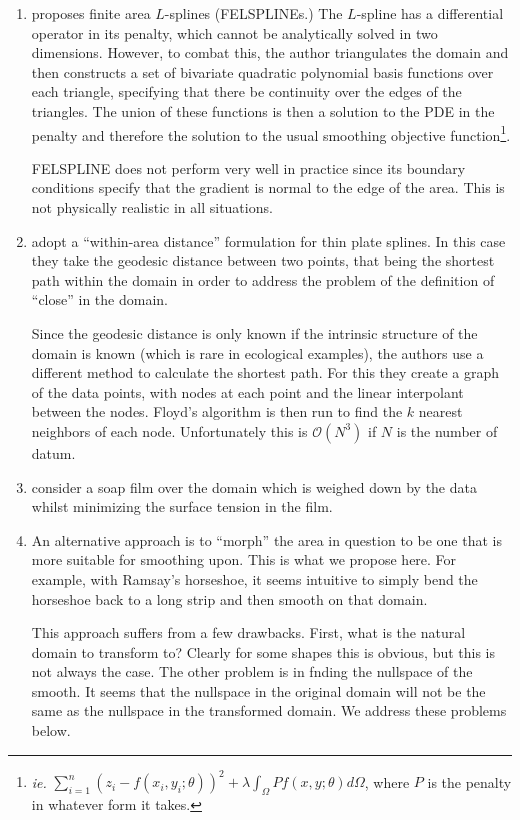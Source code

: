 \documentclass[a4paper,10pt]{amsart}
\begin{document}
\begin{enumerate}
\item \cite{ramsay} proposes finite area $L$-splines (FELSPLINEs.) The $L$-spline has a differential operator in its penalty, which cannot be analytically solved in two dimensions. However, to combat this, the author triangulates the domain and then constructs a set of bivariate quadratic polynomial basis functions over each triangle, specifying that there be continuity over the edges of the triangles. The union of these functions is then a solution to the PDE in the penalty and therefore the solution to the usual smoothing objective function\footnote{\emph{ie.} $\sum_{i=1}^n (z_i-f(x_i,y_i;\theta))^2 + \lambda \int_\Omega Pf(x,y;\theta)d\Omega$, where $P$  is the penalty in whatever form it takes.}.

FELSPLINE does not perform very well in practice since its boundary conditions specify that the gradient is normal to the edge of the area. This is not physically realistic in all situations.

\item \cite{wangranalli} adopt a ``within-area distance'' formulation for thin plate splines. In this case they take the geodesic distance between two points, that being the shortest path within the domain in order to address the problem of the definition of ``close'' in the domain. 

Since the geodesic distance is only known if the intrinsic structure of the domain is known (which is rare in ecological examples), the authors use a different method to calculate the shortest path. For this they create a graph of the data points, with nodes at each point and the linear interpolant between the nodes. Floyd's algorithm is then run to find the $k$ nearest neighbors of each node. Unfortunately this is $\mathcal{O}(N^3)$ if $N$ is the number of datum.


\item \cite{soap} consider a soap film over the domain which is weighed down by the data whilst minimizing the surface tension in the film.

\item An alternative approach is to ``morph'' the area in question to be one that is more suitable for smoothing upon. This is what we propose here. For example, with Ramsay's horseshoe, it seems intuitive to simply bend the horseshoe back to a long strip and then smooth on that domain.

This approach suffers from a few drawbacks. First, what is the natural domain to transform to? Clearly for some shapes this is obvious, but this is not always the case. The other problem is in fnding the nullspace of the smooth. It seems that the nullspace in the original domain will not be the same as the nullspace in the transformed domain. We address these problems below.


\end{enumerate}
\end{document}
